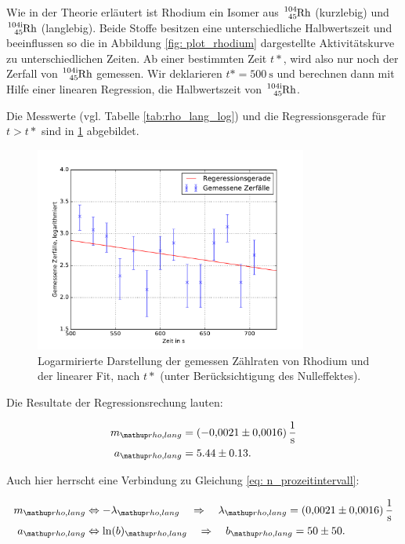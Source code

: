 Wie in der Theorie erläutert ist Rhodium ein Isomer aus $\ce{^{104}_{45} Rh}$ (kurzlebig) und
$\ce{^{104i}_{45} Rh}$ (langlebig). Beide Stoffe besitzen eine unterschiedliche Halbwertszeit und
beeinflussen so die in Abbildung \ref{fig: plot_rhodium} dargestellte Aktivitätskurve zu unterschiedlichen
Zeiten.
Ab einer bestimmten Zeit $t*$, wird also nur noch der Zerfall von $\ce{^{104i}_{45} Rh}$
gemessen.
Wir deklarieren $t*=\SI{500}{\second}$ und berechnen dann mit Hilfe einer linearen Regression,
die Halbwertszeit von $\ce{^{104i}_{45} Rh}$.

Die Messwerte (vgl. Tabelle \ref{tab:rho_lang_log}) und die Regressionsgerade für $t>t*$ sind in \ref{fig: plot_rhodium_lang} abgebildet.

\begin{figure}
  \centering
  \includegraphics[width=0.8\textwidth]{pics/rhodium_lang_miterror.pdf}
  \caption{Logarmirierte Darstellung der gemessen Zählraten von Rhodium und der linearer Fit, nach $t*$  (unter Berücksichtigung des Nulleffektes).}
  \label{fig: plot_rhodium_lang}
\end{figure}

Die Resultate der Regressionsrechung lauten:

\begin{align}
  \label{eq:parameter_rhodium_lang}
  \begin{aligned}
    m\ua{rho,lang}&=\SI{-0.0021\pm0.0016}{\per\second}\\
    a\ua{rho,lang}&=5.44\pm0.13.
  \end{aligned}
\end{align}


Auch hier herrscht eine Verbindung zu Gleichung \eqref{eq: n_prozeitintervall}:

\begin{align}
  \label{eq:parameter_rhodium_lang_lambda}
  \begin{aligned}
    m\ua{rho,lang}&\Leftrightarrow -\lambda\ua{rho,lang} \quad \Rightarrow \quad \lambda\ua{rho,lang}=\SI{0.0021\pm0.0016}{\per\second}\\
    a\ua{rho,lang}&\Leftrightarrow \ln(b)\ua{rho,lang} \quad \Rightarrow \quad b\ua{rho,lang} =50\pm 50.
  \end{aligned}
\end{align}

